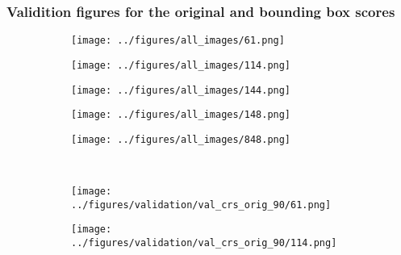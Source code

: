 \newpage
\subsubsection{Validition figures for the original and bounding box scores}\label{SS:furtherval}
\begin{figure}[h!]
	\begin{subfigure}[b]{0.03\textwidth} %
		\centering
	\end{subfigure}
	\hspace{0.05cm}
	\begin{subfigure}{0.18\textwidth}
		\centering
		\texttt{[image: ../figures/all\_images/61.png]}
		\label{fig:1}
	\end{subfigure}
	\begin{subfigure}{0.18\textwidth}
		\centering
		\texttt{[image: ../figures/all\_images/114.png]}
		\label{fig:1}
	\end{subfigure}
	\begin{subfigure}{0.18\textwidth}
		\centering
		\texttt{[image: ../figures/all\_images/144.png]}
		\label{fig:1}
	\end{subfigure}
	\begin{subfigure}{0.18\textwidth}
		\centering
		\texttt{[image: ../figures/all\_images/148.png]}
		\label{fig:1}
	\end{subfigure}
	\begin{subfigure}{0.18\textwidth}
		\centering
		\texttt{[image: ../figures/all\_images/848.png]}
		\label{fig:1}
	\end{subfigure}
	\vspace{-0.35cm}
	\\
			\begin{subfigure}[b]{0.03\textwidth} %
		\centering
	\end{subfigure}
	\hspace{0.05cm}
	\begin{subfigure}{0.18\textwidth}
		\centering
		\texttt{[image: ../figures/validation/val\_crs\_orig\_90/61.png]}
		\label{fig:1}
	\end{subfigure}
	\begin{subfigure}{0.18\textwidth}
		\centering
		\texttt{[image: ../figures/validation/val\_crs\_orig\_90/114.png]}

\end{subfigure}
\end{figure}

